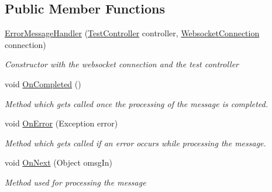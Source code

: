 \subsection*{Public Member Functions}
\begin{DoxyCompactItemize}
\item 
\hyperlink{class_web_analyzer_1_1_server_1_1_message_handler_1_1_error_message_handler_a49c29974eceb3140f965c3688924e7c9}{Error\+Message\+Handler} (\hyperlink{class_web_analyzer_1_1_controller_1_1_test_controller}{Test\+Controller} controller, \hyperlink{class_web_analyzer_1_1_server_1_1_websocket_connection}{Websocket\+Connection} connection)
\begin{DoxyCompactList}\small\item\em Constructor with the websocket connection and the test controller \end{DoxyCompactList}\item 
void \hyperlink{class_web_analyzer_1_1_server_1_1_message_handler_1_1_error_message_handler_a243ac4b4c08be9b91180fd2106917140}{On\+Completed} ()
\begin{DoxyCompactList}\small\item\em Method which gets called once the processing of the message is completed. \end{DoxyCompactList}\item 
void \hyperlink{class_web_analyzer_1_1_server_1_1_message_handler_1_1_error_message_handler_a947628296b419a68d81fad5f22b0e0dc}{On\+Error} (Exception error)
\begin{DoxyCompactList}\small\item\em Method which gets called if an error occurs while processing the message. \end{DoxyCompactList}\item 
void \hyperlink{class_web_analyzer_1_1_server_1_1_message_handler_1_1_error_message_handler_aae02faae79d883042e71f70706bdcfce}{On\+Next} (Object omsg\+In)
\begin{DoxyCompactList}\small\item\em Method used for processing the message \end{DoxyCompactList}\end{DoxyCompactItemize}
